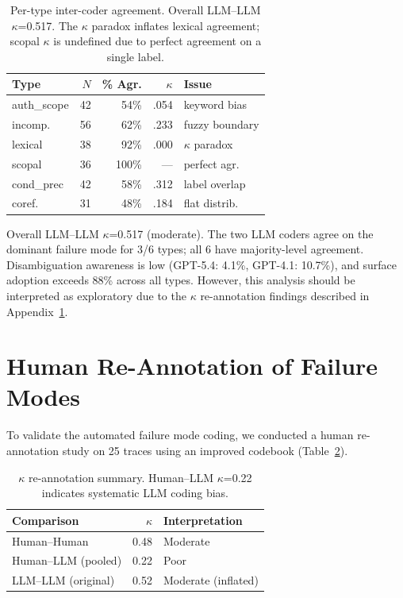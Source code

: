 \documentclass[11pt]{article}
\begin{document}
\begin{table}[h]
\centering
\small
\begin{tabular}{lrrrl}
\toprule
\textbf{Type} & \textbf{$N$} & \textbf{\% Agr.} & \textbf{$\kappa$} & \textbf{Issue} \\
\midrule
auth\_scope & 42 & 54\% & .054 & keyword bias \\
incomp. & 56 & 62\% & .233 & fuzzy boundary \\
lexical & 38 & 92\% & .000 & $\kappa$ paradox \\
scopal & 36 & 100\% & --- & perfect agr. \\
cond\_prec & 42 & 58\% & .312 & label overlap \\
coref. & 31 & 48\% & .184 & flat distrib. \\
\bottomrule
\end{tabular}
\caption{Per-type inter-coder agreement. Overall LLM--LLM $\kappa$=0.517. The $\kappa$ paradox inflates lexical agreement; scopal $\kappa$ is undefined due to perfect agreement on a single label.}
\label{tab:error_icc}
\end{table}

Overall LLM--LLM $\kappa$=0.517 (moderate).
The two LLM coders agree on the dominant failure mode for 3/6 types; all 6 have majority-level agreement.
Disambiguation awareness is low (GPT-5.4: 4.1\%, GPT-4.1: 10.7\%), and surface adoption exceeds 88\% across all types.
However, this analysis should be interpreted as exploratory due to the $\kappa$ re-annotation findings described in Appendix~\ref{sec:app_kappa}.

\section{Human Re-Annotation of Failure Modes}
\label{sec:app_kappa}

To validate the automated failure mode coding, we conducted a human re-annotation study on 25 traces using an improved codebook (Table~\ref{tab:kappa_summary}).

\begin{table}[h]
\centering
\small
\begin{tabular}{lrl}
\toprule
\textbf{Comparison} & \textbf{$\kappa$} & \textbf{Interpretation} \\
\midrule
Human--Human & 0.48 & Moderate \\
Human--LLM (pooled) & 0.22 & Poor \\
LLM--LLM (original) & 0.52 & Moderate (inflated) \\
\bottomrule
\end{tabular}
\caption{$\kappa$ re-annotation summary. Human--LLM $\kappa$=0.22 indicates systematic LLM coding bias.}
\label{tab:kappa_summary}
\end{table}
\end{document}
